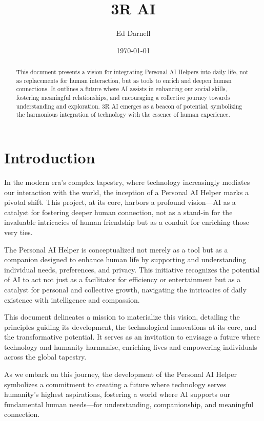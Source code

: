 \documentclass[12pt]{article}
\title{3R AI}
\author{Ed Darnell}
\date{\today}
\begin{document}
\maketitle

\begin{abstract}
This document presents a vision for integrating Personal AI Helpers into daily life, not as replacements for human interaction, but as tools to enrich and deepen human connections. It outlines a future where AI assists in enhancing our social skills, fostering meaningful relationships, and encouraging a collective journey towards understanding and exploration. 3R AI emerges as a beacon of potential, symbolizing the harmonious integration of technology with the essence of human experience.
\end{abstract}

\section*{Introduction}

In the modern era's complex tapestry, where technology increasingly mediates our interaction with the world, the inception of a Personal AI Helper marks a pivotal shift. This project, at its core, harbors a profound vision—AI as a catalyst for fostering deeper human connection, not as a stand-in for the invaluable intricacies of human friendship but as a conduit for enriching those very ties.

The Personal AI Helper is conceptualized not merely as a tool but as a companion designed to enhance human life by supporting and understanding individual needs, preferences, and privacy. This initiative recognizes the potential of AI to act not just as a facilitator for efficiency or entertainment but as a catalyst for personal and collective growth, navigating the intricacies of daily existence with intelligence and compassion.

This document delineates a mission to materialize this vision, detailing the principles guiding its development, the technological innovations at its core, and the transformative potential. It serves as an invitation to envisage a future where technology and humanity harmanise, enriching lives and empowering individuals across the global tapestry.

As we embark on this journey, the development of the Personal AI Helper symbolizes a commitment to creating a future where technology serves humanity's highest aspirations, fostering a world where AI supports our fundamental human needs—for understanding, companionship, and meaningful connection.
\end{document}

